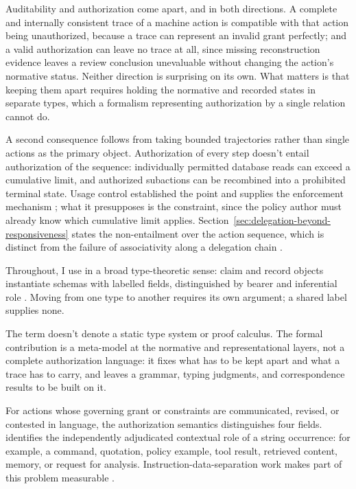 Auditability and authorization come apart, and in both directions. A complete and internally consistent trace of a machine action is compatible with that action being unauthorized, because a trace can represent an invalid grant perfectly; and a valid authorization can leave no trace at all, since missing reconstruction evidence leaves a review conclusion unevaluable without changing the action's normative status. Neither direction is surprising on its own. What matters is that keeping them apart requires holding the normative and recorded states in separate types, which a formalism representing authorization by a single relation cannot do.

A second consequence follows from taking bounded trajectories rather than single actions as the primary object. Authorization of every step doesn't entail authorization of the sequence: individually permitted database reads can exceed a cumulative limit, and authorized subactions can be recombined into a prohibited terminal state. Usage control established the point and supplies the enforcement mechanism \citep{park2004ucon}; what it presupposes is the constraint, since the policy author must already know which cumulative limit applies. Section~\ref{sec:delegation-beyond-responsiveness} states the non-entailment over the action sequence, which is distinct from the failure of associativity along a delegation chain \citep{abadi1993calculus}.

Throughout, I use  in a broad type-theoretic sense: claim and record objects instantiate schemas with labelled fields, distinguished by bearer and inferential role \citep[sec.~11.8]{pierce2002types}. Moving from one type to another requires its own argument; a shared label supplies none.

The term doesn't denote a static type system or proof calculus. The formal contribution is a meta-model at the normative and representational layers, not a complete authorization language: it fixes what has to be kept apart and what a trace has to carry, and leaves a grammar, typing judgments, and correspondence results to be built on it.

For actions whose governing grant or constraints are communicated, revised, or contested in language, the authorization semantics distinguishes four fields.  identifies the independently adjudicated contextual role of a string occurrence: for example, a command, quotation, policy example, tool result, retrieved content, memory, or request for analysis. Instruction-data-separation work makes part of this problem measurable \parencite{zverev2025separate}.

